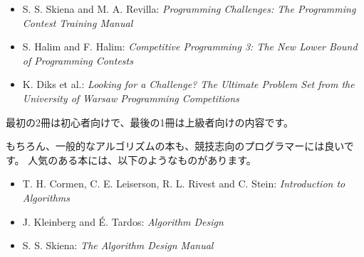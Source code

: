 \begin{itemize}
\item S. S. Skiena and M. A. Revilla:
\emph{Programming Challenges: The Programming Contest Training Manual} \cite{ski03}
\item S. Halim and F. Halim:
\emph{Competitive Programming 3: The New Lower Bound of Programming Contests} \cite{hal13}
\item K. Diks et al.: \emph{Looking for a Challenge? The Ultimate Problem Set from
the University of Warsaw Programming Competitions} \cite{dik12}
\end{itemize}

最初の2冊は初心者向けで、最後の1冊は上級者向けの内容です。

もちろん、一般的なアルゴリズムの本も、競技志向のプログラマーには良いです。
人気のある本には、以下のようなものがあります。

\begin{itemize}
\item T. H. Cormen, C. E. Leiserson, R. L. Rivest and C. Stein:
\emph{Introduction to Algorithms} \cite{cor09}
\item J. Kleinberg and É. Tardos:
\emph{Algorithm Design} \cite{kle05}
\item S. S. Skiena:
\emph{The Algorithm Design Manual} \cite{ski08}
\end{itemize}
